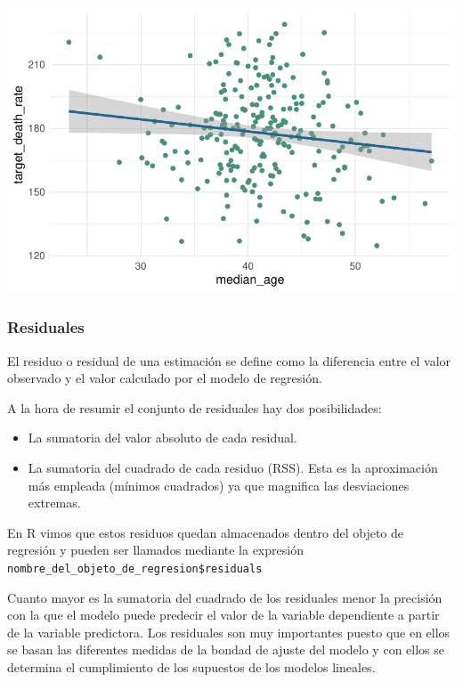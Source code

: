 \documentclass[
  letterpaper,
  DIV=11,
  numbers=noendperiod]{scrartcl}
\begin{document}
\begin{center}
\includegraphics{index_files/figure-pdf/unnamed-chunk-29-1.pdf}
\end{center}

\subsubsection{Residuales}\label{residuales}

El residuo o residual de una estimación se define como la diferencia
entre el valor observado y el valor calculado por el modelo de
regresión.

A la hora de resumir el conjunto de residuales hay dos posibilidades:

\begin{itemize}
\item
  La sumatoria del valor absoluto de cada residual.
\item
  La sumatoria del cuadrado de cada residuo (RSS). Esta es la
  aproximación más empleada (mínimos cuadrados) ya que magnifica las
  desviaciones extremas.
\end{itemize}

En R vimos que estos residuos quedan almacenados dentro del objeto de
regresión y pueden ser llamados mediante la expresión
\texttt{nombre\_del\_objeto\_de\_regresion\$residuals}

Cuanto mayor es la sumatoria del cuadrado de los residuales menor la
precisión con la que el modelo puede predecir el valor de la variable
dependiente a partir de la variable predictora. Los residuales son muy
importantes puesto que en ellos se basan las diferentes medidas de la
bondad de ajuste del modelo y con ellos se determina el cumplimiento de
los supuestos de los modelos lineales.
\end{document}
